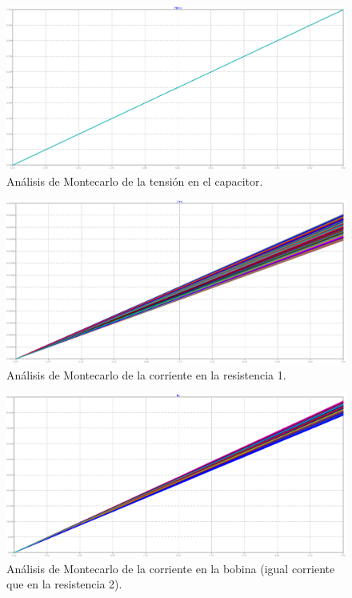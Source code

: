 \documentclass[a4paper]{article}
\begin{document}
\begin{figure}[H]
	\centering
	\includegraphics[width=\textwidth]{LTSpice-MC1-VC}
	\caption{Análisis de Montecarlo de la tensión en el capacitor.}
	\label{fig:LTSMCVC}
\end{figure}

\begin{figure}[H]
	\centering
	\includegraphics[width=\textwidth]{LTSpice-MC1-IR}
	\caption{Análisis de Montecarlo de la corriente en la resistencia 1.}
	\label{fig:LTSMCIR}
\end{figure}

\begin{figure}[H]
	\centering
	\includegraphics[width=\textwidth]{LTSpice-MC1-IL}
	\caption{Análisis de Montecarlo de la corriente en la bobina (igual corriente que en la resistencia 2).}
	\label{fig:LTSMCIL}
\end{figure}
\end{document}
